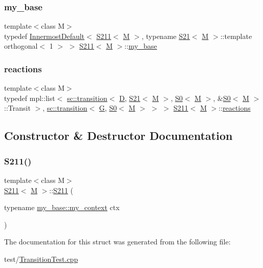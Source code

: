 \subsubsection{\texorpdfstring{my\+\_\+base}{my\_base}}
{\footnotesize\ttfamily template$<$class M$>$ \\
typedef \mbox{\hyperlink{struct_innermost_default}{Innermost\+Default}}$<$ \mbox{\hyperlink{struct_s211}{S211}}$<$ \mbox{\hyperlink{struct_m}{M}} $>$, typename \mbox{\hyperlink{struct_s21}{S21}}$<$ \mbox{\hyperlink{struct_m}{M}} $>$\+::template orthogonal$<$ 1 $>$ $>$ \mbox{\hyperlink{struct_s211}{S211}}$<$ \mbox{\hyperlink{struct_m}{M}} $>$\+::\mbox{\hyperlink{struct_s211_a172b794daf227a390ed097773909f4dd}{my\+\_\+base}}}

\mbox{\label{struct_s211_a241591925fcba8a8940f0680d1b42429}} 
\subsubsection{\texorpdfstring{reactions}{reactions}}
{\footnotesize\ttfamily template$<$class M$>$ \\
typedef mpl\+::list$<$ \mbox{\hyperlink{classboost_1_1statechart_1_1transition}{sc\+::transition}}$<$ \mbox{\hyperlink{struct_d}{D}}, \mbox{\hyperlink{struct_s21}{S21}}$<$ \mbox{\hyperlink{struct_m}{M}} $>$, \mbox{\hyperlink{struct_s0}{S0}}$<$ \mbox{\hyperlink{struct_m}{M}} $>$, \&\mbox{\hyperlink{struct_s0}{S0}}$<$ \mbox{\hyperlink{struct_m}{M}} $>$\+::Transit $>$, \mbox{\hyperlink{classboost_1_1statechart_1_1transition}{sc\+::transition}}$<$ \mbox{\hyperlink{struct_g}{G}}, \mbox{\hyperlink{struct_s0}{S0}}$<$ \mbox{\hyperlink{struct_m}{M}} $>$ $>$ $>$ \mbox{\hyperlink{struct_s211}{S211}}$<$ \mbox{\hyperlink{struct_m}{M}} $>$\+::\mbox{\hyperlink{struct_s211_a241591925fcba8a8940f0680d1b42429}{reactions}}}



\subsection{Constructor \& Destructor Documentation}
\mbox{\label{struct_s211_a404920e03945d6ba60c1d4b46d50105b}} 
\subsubsection{\texorpdfstring{S211()}{S211()}}
{\footnotesize\ttfamily template$<$class M$>$ \\
\mbox{\hyperlink{struct_s211}{S211}}$<$ \mbox{\hyperlink{struct_m}{M}} $>$\+::\mbox{\hyperlink{struct_s211}{S211}} (\begin{DoxyParamCaption}\item[{typename \mbox{\hyperlink{struct_innermost_default_a0aab337364dec3101e80f293b709d53d}{my\+\_\+base\+::my\+\_\+context}}}]{ctx }\end{DoxyParamCaption})\hspace{0.3cm}{\ttfamily [inline]}}



The documentation for this struct was generated from the following file\+:\begin{DoxyCompactItemize}
\item 
test/\mbox{\hyperlink{_transition_test_8cpp}{Transition\+Test.\+cpp}}\end{DoxyCompactItemize}
